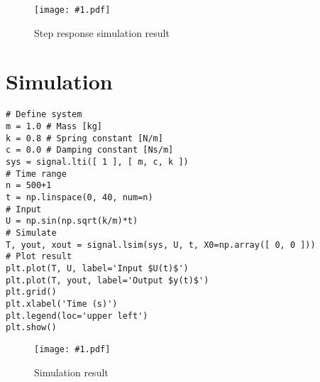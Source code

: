 \documentclass[a4paper,12pt]{article}
\newcommand{\Fig}[3]{%
	\begin{figure}[htb]%
	\begin{center}%
	\texttt{[image: \#1.pdf]}%
	\end{center}%
	\caption{#3\label{fig:#1}}%
	\end{figure}%
	}
\newcommand{\Section}[2]{\section{#2}\label{section:#1}}
\begin{document}
\Fig{step}{0.7}{Step response simulation result}

\Section{simulate}{Simulation}



\begin{verbatim}
# Define system
m = 1.0 # Mass [kg]
k = 0.8 # Spring constant [N/m]
c = 0.0 # Damping constant [Ns/m]
sys = signal.lti([ 1 ], [ m, c, k ])
# Time range
n = 500+1
t = np.linspace(0, 40, num=n)
# Input
U = np.sin(np.sqrt(k/m)*t)
# Simulate
T, yout, xout = signal.lsim(sys, U, t, X0=np.array([ 0, 0 ]))
# Plot result
plt.plot(T, U, label='Input $U(t)$')
plt.plot(T, yout, label='Output $y(t)$')
plt.grid()
plt.xlabel('Time (s)')
plt.legend(loc='upper left')
plt.show()
\end{verbatim}

\Fig{simulate_lsim}{0.7}{Simulation result}

\end{document}

